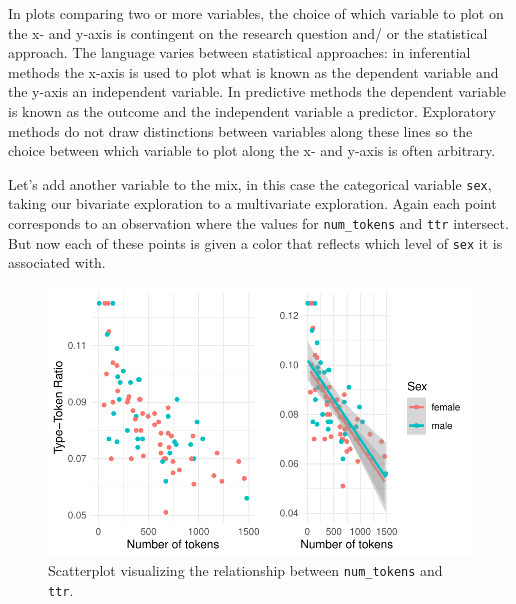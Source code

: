 \documentclass[
  letterpaper,
]{scrbook}
\begin{document}
\begin{tcolorbox}[enhanced jigsaw, title=\textcolor{quarto-callout-warning-color}{\faExclamationTriangle}\hspace{0.5em}{Tip}, breakable, colback=white, colframe=quarto-callout-warning-color-frame, bottomrule=.15mm, left=2mm, bottomtitle=1mm, colbacktitle=quarto-callout-warning-color!10!white, opacityback=0, arc=.35mm, toprule=.15mm, coltitle=black, leftrule=.75mm, opacitybacktitle=0.6, toptitle=1mm, titlerule=0mm, rightrule=.15mm]

In plots comparing two or more variables, the choice of which variable
to plot on the x- and y-axis is contingent on the research question and/
or the statistical approach. The language varies between statistical
approaches: in inferential methods the x-axis is used to plot what is
known as the dependent variable and the y-axis an independent variable.
In predictive methods the dependent variable is known as the outcome and
the independent variable a predictor. Exploratory methods do not draw
distinctions between variables along these lines so the choice between
which variable to plot along the x- and y-axis is often arbitrary.

\end{tcolorbox}

Let's add another variable to the mix, in this case the categorical
variable \texttt{sex}, taking our bivariate exploration to a
multivariate exploration. Again each point corresponds to an observation
where the values for \texttt{num\_tokens} and \texttt{ttr} intersect.
But now each of these points is given a color that reflects which level
of \texttt{sex} it is associated with.

\begin{figure}[h]

{\centering \includegraphics{./approaching-analysis_files/figure-pdf/fig-summaries-multivariate-scatterplot-belc-1.pdf}

}

\caption{\label{fig-summaries-multivariate-scatterplot-belc}Scatterplot
visualizing the relationship between \texttt{num\_tokens} and
\texttt{ttr}.}

\end{figure}
\end{document}
